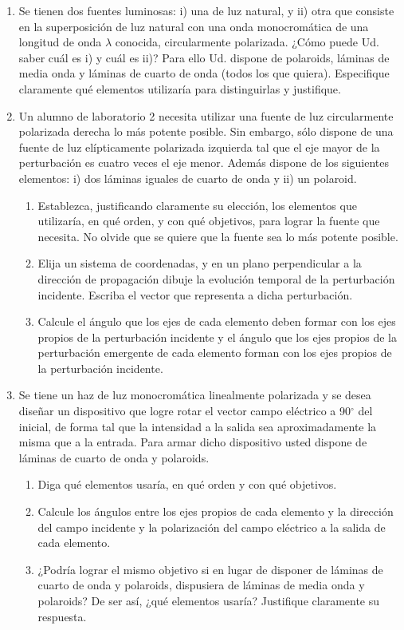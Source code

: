 \documentclass[11pt,spanish,a4paper]{article}
\begin{document}
\begin{enumerate}
\item Se tienen dos fuentes luminosas: i) una de luz natural, y ii) otra
que consiste en la superposición de luz natural con una onda monocromática
de una longitud de onda $\lambda$ conocida, circularmente polarizada.
¿Cómo puede Ud. saber cuál es i) y cuál es ii)? Para ello Ud. dispone
de polaroids, láminas de media onda y láminas de cuarto de onda (todos
los que quiera). Especifique claramente qué elementos utilizaría para
distinguirlas y justifique.


\item Un alumno de laboratorio 2 necesita utilizar una fuente de luz circularmente
polarizada derecha lo más potente posible. Sin embargo, sólo dispone
de una fuente de luz elípticamente polarizada izquierda tal que el
eje mayor de la perturbación es cuatro veces el eje menor. Además
dispone de los siguientes elementos: i) dos láminas iguales de cuarto
de onda y ii) un polaroid.
\begin{enumerate}
\item Establezca, justificando claramente su elección, los elementos que
utilizaría, en qué orden, y con qué objetivos, para lograr la fuente
que necesita. No olvide que se quiere que la fuente sea lo más potente
posible.
\item Elija un sistema de coordenadas, y en un plano perpendicular a la
dirección de propagación dibuje la evolución temporal de la perturbación
incidente. Escriba el vector que representa a dicha perturbación.
\item Calcule el ángulo que los ejes de cada elemento deben formar con los
ejes propios de la perturbación incidente y el ángulo que los ejes
propios de la perturbación emergente de cada elemento forman con los
ejes propios de la perturbación incidente.
\end{enumerate}


\item Se tiene un haz de luz monocromática linealmente polarizada y se desea
diseñar un dispositivo que logre rotar el vector campo eléctrico a
90$^{\circ}$ del inicial, de forma tal que la intensidad a la salida
sea aproximadamente la misma que a la entrada. Para armar dicho dispositivo
usted dispone de láminas de cuarto de onda y polaroids.
\begin{enumerate}
\item Diga qué elementos usaría, en qué orden y con qué objetivos.
\item Calcule los ángulos entre los ejes propios de cada elemento y la dirección
del campo incidente y la polarización del campo eléctrico a la salida
de cada elemento.
\item ¿Podría lograr el mismo objetivo si en lugar de disponer de láminas
de cuarto de onda y polaroids, dispusiera de láminas de media onda
y polaroids? De ser así, ¿qué elementos usaría? Justifique claramente
su respuesta.
\end{enumerate}



\end{enumerate}
\end{document}
